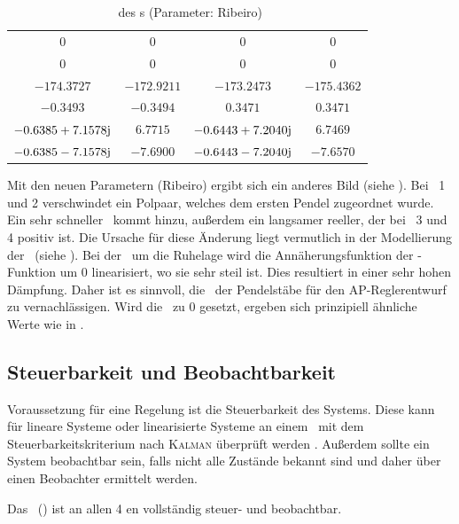 \begin{table}[htbp]
	\centering
	\caption{\ewe\ des \bss s (Parameter: Ribeiro)}
		\begin{tabular}[t]{cccc}
			\toprule
			\ape & \apz & \apd & \apv \\
			\midrule
				$0$	&	$0$	&	$0$	&	$0$	\\
				$0$	&	$0$	&	$0$	&	$0$	\\
				$-174.3727$						&	$-172.9211$	&	$-173.2473$						&	$-175.4362$	\\
				$-0.3493$							&	$-0.3494$		&	$0.3471$							&	$0.3471$	\\
				$-0.6385 + 7.1578\mathrm{j}$	&	$6.7715$		&	$-0.6443 + 7.2040\mathrm{j}$	&	$6.7469$	\\
				$-0.6385 - 7.1578\mathrm{j}$	&	$-7.6900$ 	&	$-0.6443 - 7.2040\mathrm{j}$ &	$-7.6570$ \\
			\bottomrule
		\end{tabular}
	\label{tab:ewribe}
\end{table}

Mit den neuen Parametern (Ribeiro) ergibt sich ein anderes Bild (siehe ).
Bei \ap\ 1 und 2 verschwindet ein Polpaar, welches dem ersten Pendel zugeordnet wurde. Ein sehr schneller \ew\ kommt hinzu, außerdem ein langsamer reeller, der bei \ap\ 3 und 4 positiv ist. 
Die Ursache für diese Änderung liegt vermutlich in der Modellierung der \crb\ (siehe ). Bei der \lin\ um die Ruhelage wird die Annäherungsfunktion der -Funktion um 0 linearisiert, wo sie sehr steil ist. Dies resultiert in einer sehr hohen Dämpfung. Daher ist es sinnvoll, die \crb\ der Pendelstäbe für den AP-Reglerentwurf zu vernachlässigen.
Wird die \crb\ zu 0 gesetzt, ergeben sich prinzipiell ähnliche Werte wie in .


\subsection{Steuerbarkeit und Beobachtbarkeit}

Voraussetzung für eine Regelung ist die Steuerbarkeit des Systems. Diese kann für lineare Systeme oder linearisierte Systeme an einem \ap\ mit dem Steuerbarkeitskriterium nach \textsc{Kalman} überprüft werden \cite{AdamyRT2}. Außerdem sollte ein System beobachtbar sein, falls nicht alle Zustände bekannt sind und daher über einen Beobachter ermittelt werden.

Das \spds\ (\bss) ist an allen 4 \ap en vollständig steuer- und beobachtbar.


